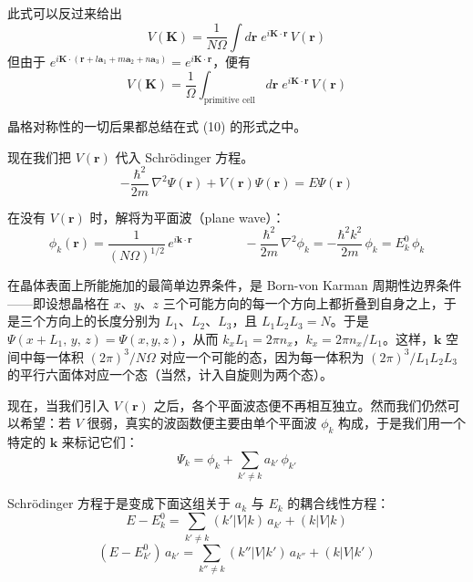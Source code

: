 此式可以反过来给出
\begin{equation*}
V(\mathbf{K}) = \frac{1}{N\Omega} \int d\mathbf{r}\; e^{i\mathbf{K}\cdot\mathbf{r}}\,V(\mathbf{r})
\end{equation*}
但由于 $e^{i\mathbf{K}\cdot(\mathbf{r} + l\mathbf{a}_1 + m\mathbf{a}_2 + n\mathbf{a}_3)} = e^{i\mathbf{K}\cdot\mathbf{r}}$，便有
\begin{equation*}
V(\mathbf{K}) = \frac{1}{\Omega} \int_{\text{primitive cell}} d\mathbf{r}\; e^{i\mathbf{K}\cdot\mathbf{r}}\,V(\mathbf{r})
\end{equation*}

晶格对称性的一切后果都总结在式 (10) 的形式之中。

现在我们把 $V(\mathbf{r})$ 代入 Schrödinger 方程。
\begin{equation*}
-\frac{\hbar^2}{2m}\,\nabla^2\Psi(\mathbf{r}) + V(\mathbf{r})\Psi(\mathbf{r}) = E\Psi(\mathbf{r})
\end{equation*}

在没有 $V(\mathbf{r})$ 时，解将为平面波（plane wave）：
\begin{equation*}
\phi_k(\mathbf{r}) = \frac{1}{(N\Omega)^{1/2}}\,e^{i\mathbf{k}\cdot\mathbf{r}} \qquad\qquad -\frac{\hbar^2}{2m}\,\nabla^2\phi_k = -\frac{\hbar^2 k^2}{2m}\,\phi_k = E_k^{0}\,\phi_k
\end{equation*}

在晶体表面上所能施加的最简单边界条件，是 Born-von Karman 周期性边界条件——即设想晶格在 $x$、$y$、$z$ 三个可能方向的每一个方向上都折叠到自身之上，于是三个方向上的长度分别为 $L_1$、$L_2$、$L_3$，且 $L_1L_2L_3 = N$。于是 $\Psi(x+L_1,\,y,\,z) = \Psi(x,y,z)$，从而 $k_xL_1 = 2\pi n_x$，$k_x = 2\pi n_x/L_1$。这样，$\mathbf{k}$ 空间中每一体积 $(2\pi)^3/N\Omega$ 对应一个可能的态，因为每一体积为 $(2\pi)^3/L_1L_2L_3$ 的平行六面体对应一个态（当然，计入自旋则为两个态）。

现在，当我们引入 $V(\mathbf{r})$ 之后，各个平面波态便不再相互独立。然而我们仍然可以希望：若 $V$ 很弱，真实的波函数便主要由单个平面波 $\phi_k$ 构成，于是我们用一个特定的 $\mathbf{k}$ 来标记它们：
\begin{equation*}
\Psi_k = \phi_k + \sum_{k'\neq k} a_{k'}\,\phi_{k'}
\end{equation*}

Schrödinger 方程于是变成下面这组关于 $a_k$ 与 $E_k$ 的耦合线性方程：
\begin{equation*}
E - E_k^{0} = \sum_{k'\neq k} (k'|V|k)\,a_{k'} + (k|V|k)
\end{equation*}
\begin{equation*}
(E - E_{k'}^{0})\,a_{k'} = \sum_{k''\neq k} (k''|V|k')\,a_{k''} + (k|V|k')
\end{equation*}

